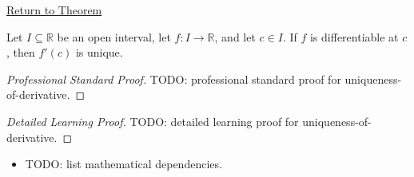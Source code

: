 \newpage
{}
\label{prf:uniqueness-of-derivative}

\begin{remark*}[Return]
\hyperref[thm:uniqueness-of-the-derivative]{Return to Theorem}
\end{remark*}

\begin{theorem*}
Let $I \subseteq \mathbb{R}$ be an open interval, let $f : I \to \mathbb{R}$, and let $c \in I$. If $f$ is differentiable at $c$, then $f'(c)$ is unique.
\end{theorem*}

\begin{proof}[Professional Standard Proof]
\LRAProofBodyStart
TODO: professional standard proof for uniqueness-of-derivative.
\end{proof}

\begin{proof}[Detailed Learning Proof]
\LRAProofBodyStart
TODO: detailed learning proof for uniqueness-of-derivative.
\end{proof}

\begin{remark*}
\end{remark*}

\begin{dependencies}
\begin{itemize}
  \item TODO: list mathematical dependencies.
\end{itemize}
\end{dependencies}

\clearpage
